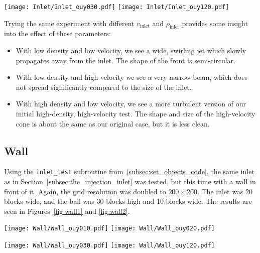 \documentclass[twocolumn]{myarticle}
\numberwithin{equation}{section}
\begin{document}
\begin{figure*}[ht]
    \centering
    \texttt{[image: Inlet/Inlet\_ouy030.pdf]}
    \texttt{[image: Inlet/Inlet\_ouy120.pdf]}
    \caption{Inlet simulation with $ v_\text{inlet} = 10 $ and $ \rho_\text{inlet} = 10 $.}
    \label{fig:inlet2}
\end{figure*}

Trying the same experiment with different $ v_\text{inlet} $ and $ \rho_\text{inlet} $ provides some insight into the effect of these parameters:
\begin{itemize}
\item
    With low density and low velocity, we see a wide, swirling jet which slowly propagates away from the inlet.
    The shape of the front is semi-circular.
\item
    With low density and high velocity we see a very narrow beam, which does not spread significantly compared to the size of the inlet.
\item
    With high density and low velocity, we see a more turbulent version of our initial high-density, high-velocity test.
    The shape and size of the high-velocity cone is about the same as our original case, but it is less clean.
\end{itemize}

\subsection{Wall}
\label{subsec:wall}

Using the \texttt{inlet\_test} subroutine from~\ref{subsec:set_objects_code}, the same inlet as in Section~\ref{subsec:the_injection_inlet} was tested, but this time with a wall in front of it.
Again, the grid resolution was doubled to $ 200\times200 $.
The inlet was $ 20 $ blocks wide, and the ball was 30 blocks high and 10 blocks wide.
The results are seen in Figures~\ref{fig:wall1} and \ref{fig:wall2}.

\begin{figure*}[ht]
    \centering
    \texttt{[image: Wall/Wall\_ouy010.pdf]}
    \texttt{[image: Wall/Wall\_ouy020.pdf]}
    \caption{Inlet simulation with $ v_\text{inlet} = 10 $ and $ \rho_\text{inlet} = 10 $ and with a wall.}
    \label{fig:wall1}
\end{figure*}

\begin{figure*}[ht]
    \centering
    \texttt{[image: Wall/Wall\_ouy030.pdf]}
    \texttt{[image: Wall/Wall\_ouy120.pdf]}
    \caption{Inlet simulation with $ v_\text{inlet} = 10 $ and $ \rho_\text{inlet} = 10 $ and with a wall.}
    \label{fig:wall2}
\end{figure*}
\end{document}
